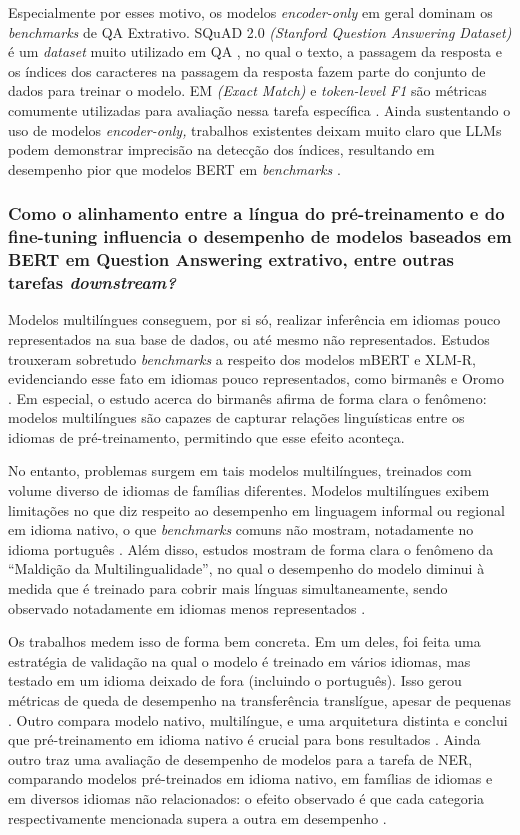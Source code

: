 \documentclass[12pt,a4paper]{article}
\begin{document}
Especialmente por esses motivo, os modelos \textit{encoder-only} em geral dominam os \textit{benchmarks} de QA Extrativo. SQuAD 2.0 \textit{(Stanford Question Answering Dataset)} é um \textit{dataset} muito utilizado em QA \cite{le, deshpande, savant}, no qual o texto, a passagem da resposta e os índices dos caracteres na passagem da resposta fazem parte do conjunto de dados para treinar o modelo. EM \textit{(Exact Match)} e \textit{token-level F1} são métricas comumente utilizadas para avaliação nessa tarefa específica \cite{savant}. Ainda sustentando o uso de modelos \textit{encoder-only,} trabalhos existentes deixam muito claro que LLMs podem demonstrar imprecisão na detecção dos índices, resultando em desempenho pior que modelos BERT em \textit{benchmarks} \cite{elvas}.

\subsubsection{Como o alinhamento entre a língua do pré-treinamento e do fine-tuning influencia o desempenho de modelos baseados em BERT em Question Answering extrativo, entre outras tarefas \textit{downstream?}}

Modelos multilíngues conseguem, por si só, realizar inferência em idiomas pouco representados na sua base de dados, ou até mesmo não representados. Estudos \cite{yadav} trouxeram sobretudo \textit{benchmarks} a respeito dos modelos mBERT e XLM-R, evidenciando esse fato em idiomas pouco representados, como birmanês \cite{kyaw} e Oromo \cite{edeti}. Em especial, o estudo acerca do birmanês afirma de forma clara o fenômeno: modelos multilíngues são capazes de capturar relações linguísticas entre os idiomas de pré-treinamento, permitindo que esse efeito aconteça.

No entanto, problemas surgem em tais modelos multilíngues, treinados com volume diverso de idiomas de famílias diferentes. Modelos multilíngues exibem limitações no que diz respeito ao desempenho em linguagem informal ou regional em idioma nativo, o que \textit{benchmarks} comuns não mostram, notadamente no idioma português \cite{villegas}. Além disso, estudos mostram de forma clara o fenômeno da ``Maldição da Multilingualidade'', no qual o desempenho do modelo diminui à medida que é treinado para cobrir mais línguas simultaneamente, sendo observado notadamente em idiomas menos representados \cite{bertomelo, savant, villegas}. 

Os trabalhos medem isso de forma bem concreta. Em um deles, foi feita uma estratégia de validação na qual o modelo é treinado em vários idiomas, mas testado em um idioma deixado de fora (incluindo o português). Isso gerou métricas de queda de desempenho na transferência translígue, apesar de pequenas \cite{yadav}. Outro compara modelo nativo, multilíngue, e uma arquitetura distinta e conclui que pré-treinamento em idioma nativo é crucial para bons resultados \cite{kyaw}. Ainda outro traz uma avaliação de desempenho de modelos para a tarefa de NER, comparando modelos pré-treinados em idioma nativo, em famílias de idiomas e em diversos idiomas não relacionados: o efeito observado é que cada categoria respectivamente mencionada supera a outra em desempenho \cite{ramy}.
\end{document}
